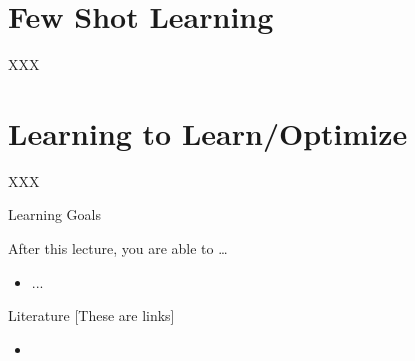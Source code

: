 \section{Few Shot Learning}
\begin{frame}[c]{XXX}



\end{frame}
\section{Learning to Learn/Optimize}
\begin{frame}[c]{XXX}



\end{frame}

\begin{frame}[c]{Learning Goals}

After this lecture, you are able to \ldots

\begin{itemize}
	\item ...
\end{itemize}
\end{frame}

\begin{frame}[c]{Literature [These are links]}

\begin{itemize}
	\item \lit{\href{}{}}	
\end{itemize}

\end{frame}


